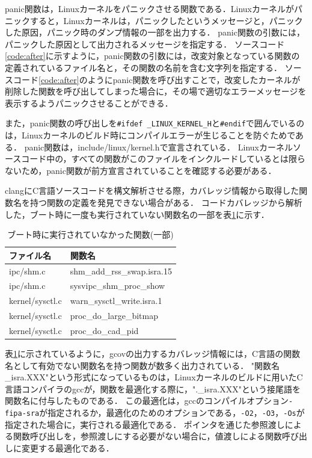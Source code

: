 \documentclass[graduation-thesis]{mlarticle}
\begin{document}
panic関数は，Linuxカーネルをパニックさせる関数である．Linuxカーネルがパニックすると，Linuxカーネルは，パニックしたというメッセージと，パニックした原因，パニック時のダンプ情報の一部を出力する．
panic関数の引数には，パニックした原因として出力されるメッセージを指定する．
ソースコード\ref{code:after}に示すように，panic関数の引数には，改変対象となっている関数の定義されているファイル名と，その関数の名前を含む文字列を指定する．
ソースコード\ref{code:after}のようにpanic関数を呼び出すことで，改変したカーネルが削除した関数を呼び出してしまった場合に，その場で適切なエラーメッセージを表示するようパニックさせることができる．

また，panic関数の呼び出しを\texttt{\#ifdef \_LINUX\_KERNEL\_H}と\texttt{\#endif}で囲んでいるのは，Linuxカーネルのビルド時にコンパイルエラーが生じることを防ぐためである．
panic関数は，include/linux/kernel.hで宣言されている．
Linuxカーネルソースコード中の，すべての関数がこのファイルをインクルードしているとは限らないため，panic関数が前方宣言されていることを確認する必要がある．

clangにC言語ソースコードを構文解析させる際，カバレッジ情報から取得した関数名を持つ関数の定義を発見できない場合がある．
コードカバレッジから解析した，ブート時に一度も実行されていない関数名の一部を表\ref{table:unusedfunctions}に示す．

\begin{table}[H]
\begin{center}
  \begin{tabular}{ll} \hline
    ファイル名 & 関数名 \\ \hline \hline
    ipc/shm.c & shm\_add\_rss\_swap.isra.15 \\
    ipc/shm.c & sysvipc\_shm\_proc\_show \\
    kernel/sysctl.c & warn\_sysctl\_write.isra.1 \\
    kernel/sysctl.c & proc\_do\_large\_bitmap \\
    kernel/sysctl.c & proc\_do\_cad\_pid \\ \hline
  \end{tabular}
  \caption{ブート時に実行されていなかった関数(一部)}
  \label{table:unusedfunctions}
\end{center}
\end{table}

表\ref{table:unusedfunctions}に示されているように，gcovの出力するカバレッジ情報には，C言語の関数名として有効でない関数名を持つ関数が数多く出力されている．
"関数名\_isra.XXX"という形式になっているものは，Linuxカーネルのビルドに用いたC言語コンパイラのgcc\cite{gcc}が，関数を最適化する際に，".\_isra.XXX"という接尾語を関数名に付与したものである．
この最適化は，gccのコンパイルオプション\texttt{-fipa-sra}が指定されるか，最適化のためのオプションである，\texttt{-O2}，\texttt{-O3}，\texttt{-Os}が指定された場合に，実行される最適化である．
ポインタを通じた参照渡しによる関数呼び出しを，参照渡しにする必要がない場合に，値渡しによる関数呼び出しに変更する最適化である．
\end{document}
